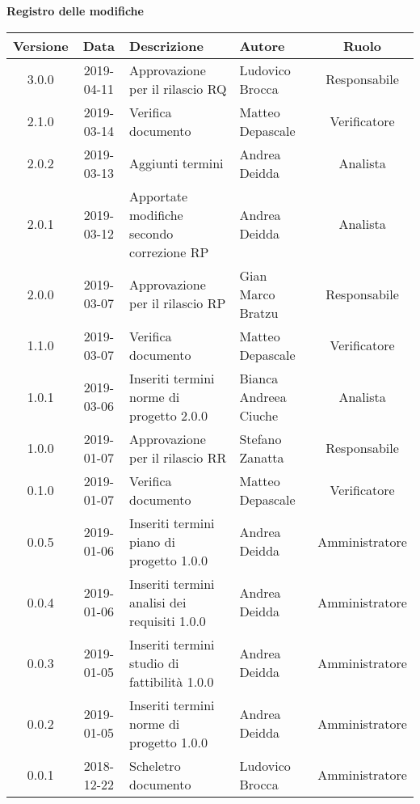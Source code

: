 \begin{center}
	\textbf{Registro delle modifiche}
	\end{center}
	\begin{center}
		\begin{tabularx}{\textwidth}{|c|c|X|X|c|}
			\hline
			\textbf{Versione} & \textbf{Data} & \textbf{Descrizione} & \textbf{Autore} & \textbf{Ruolo} \\
			\hline
			3.0.0 & 2019-04-11 & Approvazione per il rilascio RQ & Ludovico Brocca & Responsabile \\
			\hline
			2.1.0 & 2019-03-14 & Verifica documento & Matteo Depascale & Verificatore \\
			\hline
			2.0.2 & 2019-03-13 & Aggiunti termini & Andrea Deidda & Analista \\
			\hline
			2.0.1 & 2019-03-12 & Apportate modifiche secondo correzione RP & Andrea Deidda & Analista \\
			\hline
			2.0.0 & 2019-03-07 & Approvazione per il rilascio RP & Gian Marco Bratzu & Responsabile \\
			\hline
			1.1.0 & 2019-03-07 & Verifica documento & Matteo Depascale & Verificatore \\
			\hline
			1.0.1 & 2019-03-06 & Inseriti termini norme di progetto 2.0.0 & Bianca Andreea Ciuche & Analista \\
			\hline
			1.0.0 & 2019-01-07 & Approvazione per il rilascio RR & Stefano Zanatta & Responsabile \\
			\hline
			0.1.0 & 2019-01-07 & Verifica documento & Matteo Depascale & Verificatore \\
			\hline
			0.0.5 & 2019-01-06 & Inseriti termini piano di progetto 1.0.0 & Andrea Deidda & Amministratore\\
			\hline
			0.0.4 & 2019-01-06 & Inseriti termini analisi dei requisiti 1.0.0 & Andrea Deidda & Amministratore\\
			\hline
			0.0.3 & 2019-01-05 & Inseriti termini studio di fattibilità 1.0.0 & Andrea Deidda & Amministratore\\
			\hline
			0.0.2 & 2019-01-05 & Inseriti termini norme di progetto 1.0.0 & Andrea Deidda & Amministratore\\
			\hline
			0.0.1 & 2018-12-22 & Scheletro documento & Ludovico Brocca & Amministratore\\
			\hline
		\end{tabularx}
	\end{center}
\newpage
